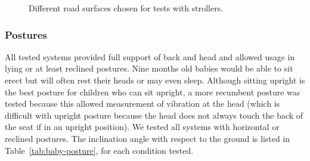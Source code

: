 \documentclass[a4paper]{article}
\begin{document}
\begin{figure}
  \centering
  \caption{Different road surfaces chosen for tests with strollers.}
  \label{fig:surfaces_stroller}
\end{figure}

\subsubsection{Postures}
All tested systems provided full support of back and head and allowed usage in
lying or at least reclined postures. Nine months old babies would be able to
sit erect but will often rest their heads or may even sleep. Although sitting
upright is the best posture for children who can sit upright, a more recumbent
posture was tested because this allowed measurement of vibration at the head
(which is difficult with upright posture because the head does not always touch
the back of the seat if in an upright position). We tested all systems with
horizontal or reclined postures. The inclination angle with respect to the
ground is listed in Table~\ref{tab:baby-posture}, for each condition tested.
%
\end{document}
